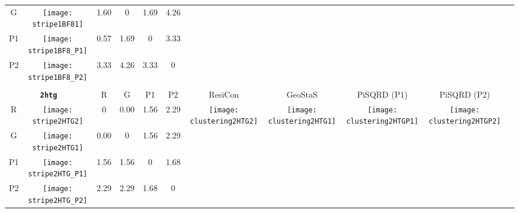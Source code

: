\documentclass[a4paper,11pt,twoside]{book}%
\begin{document}
\begin{appendices}
\begin{sidewaystable}[h!]
\begin{tabular*}{4cm}{cc|c|c|c|c|c|c|c|c|c|}
\cline{1-6}
\multicolumn{1}{|c|}{G} & \texttt{[image: stripe1BF81]} & 1.60 & 0 & 1.69 & 4.26 & \multirow{4}{*}{} & \multirow{4}{*}{} & \multirow{4}{*}{} & \multirow{4}{*}{} & \multirow{5}{*}{} \\
\cline{1-6}
\multicolumn{1}{|c|}{P1} & \texttt{[image: stripe1BF8\_P1]} & 0.57 & 1.69 & 0 & 3.33 & \multirow{4}{*}{} & \multirow{4}{*}{} & \multirow{4}{*}{} & \multirow{4}{*}{} & \multirow{5}{*}{}  \\
\cline{1-6}
\multicolumn{1}{|c|}{P2} & \texttt{[image: stripe1BF8\_P2]} & 3.33 & 4.26 & 3.33 & 0 & \multirow{4}{*}{} & \multirow{4}{*}{} & \multirow{4}{*}{} & \multirow{4}{*}{} & \multirow{5}{*}{}  \\
\cline{1-11}
\\
\cline{1-11}
\multicolumn{2}{|c|}{{\bf \texttt{2htg}}} & R & G & P1 & P2 & ResiCon & GeoStaS & PiSQRD (P1) & PiSQRD (P2) & \multirow{5}{*}{\vspace{-0.15cm}\texttt{[image: threeHistogram2HTG]}}  \\
\cline{1-10}
\multicolumn{1}{|c|}{R} & \texttt{[image: stripe2HTG2]} & 0 & 0.00 & 1.56 & 2.29 & \multirow{4}{*}{\vspace{-0.3cm}\texttt{[image: clustering2HTG2]}} & \multirow{4}{*}{\vspace{-0.3cm}\texttt{[image: clustering2HTG1]}} & \multirow{4}{*}{\vspace{-0.3cm}\texttt{[image: clustering2HTGP1]}} & \multirow{4}{*}{\vspace{-0.3cm}\texttt{[image: clustering2HTGP2]}} &  \multirow{5}{*}{} \\
\cline{1-6}
\multicolumn{1}{|c|}{G} & \texttt{[image: stripe2HTG1]} & 0.00 & 0 & 1.56 & 2.29 & \multirow{4}{*}{} & \multirow{4}{*}{} & \multirow{4}{*}{} & \multirow{4}{*}{} & \multirow{5}{*}{} \\
\cline{1-6}
\multicolumn{1}{|c|}{P1} & \texttt{[image: stripe2HTG\_P1]} & 1.56 & 1.56 & 0 & 1.68 & \multirow{4}{*}{} & \multirow{4}{*}{} & \multirow{4}{*}{} & \multirow{4}{*}{} & \multirow{5}{*}{}  \\
\cline{1-6}
\multicolumn{1}{|c|}{P2} & \texttt{[image: stripe2HTG\_P2]} & 2.29 & 2.29 & 1.68 & 0 & \multirow{4}{*}{} & \multirow{4}{*}{} & \multirow{4}{*}{} & \multirow{4}{*}{} & \multirow{5}{*}{}  \\
\cline{1-11}
\end{tabular*}
\normalfont
\end{sidewaystable}




\end{appendices}
\end{document}
